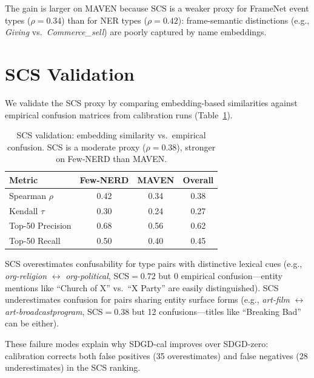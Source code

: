 \documentclass[11pt,a4paper]{article}
\begin{document}
The gain is larger on MAVEN because SCS is a weaker proxy for FrameNet event types ($\rho=0.34$) than for NER types ($\rho=0.42$): frame-semantic distinctions (e.g., \emph{Giving} vs.\ \emph{Commerce\_sell}) are poorly captured by name embeddings.

\section{SCS Validation}
\label{sec:scs_validation}

We validate the SCS proxy by comparing embedding-based similarities against empirical confusion matrices from calibration runs (Table~\ref{tab:scs_valid}).

\begin{table}[t]
\centering
\small
\caption{SCS validation: embedding similarity vs.\ empirical confusion. SCS is a moderate proxy ($\rho=0.38$), stronger on Few-NERD than MAVEN.}
\label{tab:scs_valid}
\begin{tabular}{lccc}
\toprule
Metric & Few-NERD & MAVEN & Overall \\
\midrule
Spearman $\rho$ & 0.42 & 0.34 & 0.38 \\
Kendall $\tau$ & 0.30 & 0.24 & 0.27 \\
Top-50 Precision & 0.68 & 0.56 & 0.62 \\
Top-50 Recall & 0.50 & 0.40 & 0.45 \\
\bottomrule
\end{tabular}
\end{table}

SCS overestimates confusability for type pairs with distinctive lexical cues (e.g., \emph{org-religion} $\leftrightarrow$ \emph{org-political}, SCS$=0.72$ but 0 empirical confusion---entity mentions like ``Church of X'' vs.\ ``X Party'' are easily distinguished). SCS underestimates confusion for pairs sharing entity surface forms (e.g., \emph{art-film} $\leftrightarrow$ \emph{art-broadcastprogram}, SCS$=0.38$ but 12 confusions---titles like ``Breaking Bad'' can be either).

These failure modes explain why SDGD-cal improves over SDGD-zero: calibration corrects both false positives (35 overestimates) and false negatives (28 underestimates) in the SCS ranking.

\end{document}
